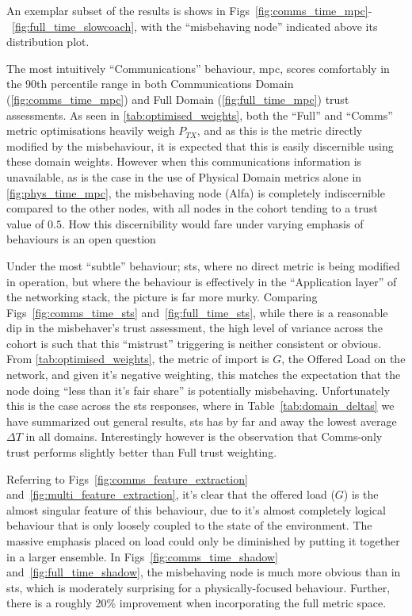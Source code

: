 An exemplar subset of the results is shows in Figs~\ref{fig:comms_time_mpc}-~\ref{fig:full_time_slowcoach}, with the ``misbehaving node'' indicated above its distribution plot.

The most intuitively ``Communications'' behaviour, \gls{mpc}, scores comfortably in the 90th percentile range in both Communications Domain (\autoref{fig:comms_time_mpc}) and Full Domain (\autoref{fig:full_time_mpc})  trust assessments. As seen in \autoref{tab:optimised_weights}, both the ``Full'' and ``Comms'' metric optimisations heavily weigh $P_{TX}$, and as this is the metric directly modified by the misbehaviour, it is expected that this is easily discernible using these domain weights.
However when this communications information is unavailable, as is the case in the use of Physical Domain metrics alone in \autoref{fig:phys_time_mpc}, the misbehaving node (Alfa) is completely indiscernible compared to the other nodes, with all nodes in the cohort tending to a trust value of $0.5$.
How this discernibility would fare under varying emphasis of behaviours is an open question

Under the most ``subtle'' behaviour; \gls{sts}, where no direct metric is being modified in operation, but where the behaviour is effectively in the ``Application layer'' of the networking stack, the picture is far more murky. 
Comparing Figs~\ref{fig:comms_time_sts} and~\ref{fig:full_time_sts}, while there is a reasonable dip in the misbehaver’s trust assessment, the high level of variance across the cohort is such that this ``mistrust'' triggering is neither consistent or obvious. 
From \autoref{tab:optimised_weights}, the metric of import is $G$, the Offered Load on the network, and given it's negative weighting, this matches the expectation that the node doing ``less than it's fair share'' is potentially misbehaving. 
Unfortunately this is the case across the \gls{sts} responses, where in Table~\ref{tab:domain_deltas} we have summarized out general results, \gls{sts} has by far and away the lowest average $\Delta T$ in all domains. 
Interestingly however is the observation that Comms-only trust performs slightly better than Full trust weighting.

Referring to Figs~\ref{fig:comms_feature_extraction} and~\autoref{fig:multi_feature_extraction}, it's clear that the offered load ($G$) is the almost singular feature of this behaviour, due to it's almost completely logical behaviour that is only loosely coupled to the state of the environment. 
The massive emphasis placed on load could only be diminished by putting it together in a larger ensemble.
In Figs~\ref{fig:comms_time_shadow} and~\ref{fig:full_time_shadow}, the misbehaving node is much more obvious than in \gls{sts}, which is moderately surprising for a physically-focused behaviour. Further, there is a roughly 20\% improvement when incorporating the full metric space.

